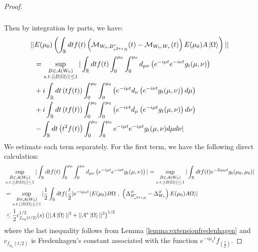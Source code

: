 \documentclass[a4paper,11pt]{article}
\theoremstyle{definition}
\newcommand{\lb}{\left(}
\newcommand{\rb}{\right)}
\begin{document}
\begin{proof}
\begin{align}
\begin{split}
        \end{split}
    \end{align}
    Then by integration by parts, we have:
    \begin{align}
        \begin{split}
            ||&E(\mu_0)\lb\int_\mathbb{R} dt f(t)\lb\mathcal{M}_{W_0,B^r_{e^{2\pi s}R}}(t) - \mathcal{M}_{W_0, W_r}(t)\rb E(\mu_0) A\ket{\Omega}\rb||
            \\&
            = \sup_{\substack{B\in\mathcal{A}(W_0)\\s.t.||B\ket{\Omega}||\leq 1}}|\int_\mathbb{R} dt f(t)\int_0^{\mu_0}\int_0^{\mu_0}d_{\mu\nu}\lb e^{-i\mu t}e^{-i\nu t}g_t(\mu,\nu)\rb 
            \\&
            + i\int_\mathbb{R} dt \lb tf(t)\rb\int_0^{\mu_0}\int_0^{\mu_0}\lb e^{-i\mu t}d_\nu \lb e^{-i\nu t}g_t(\mu,\nu) \rb d\mu\rb
            \\&
            +i\int_\mathbb{R} dt \lb tf(t)\rb\int_0^{\mu_0}\int_0^{\mu_0}\lb e^{-i\nu t} d_\mu\lb e^{-i\mu t} g_t(\mu,\nu)\rb d\nu\rb 
            \\&
            - \int_\mathbb{R} dt \lb t^2f(t) \rb\int_0^{\mu_0}\int_0^{\mu_0} e^{-i\mu t}e^{-i\mu t}g_t(\mu,\nu)d\mu d\nu|
        \end{split}
    \end{align}
    We estimate each term separately. For the first term, we have the following direct calculation:
    \begin{align}
        \begin{split}
            &\sup_{\substack{B\in\mathcal{A}(W_0)\\s.t.||B\ket{\Omega}||\leq 1}}|\int_\mathbb{R} dt f(t)\int_0^{\mu_0}\int_0^{\mu_0} d_{\mu\nu}\lb e^{-i\mu t}e^{-i\nu t}g_t(\mu,\nu) \rb| = \sup_{\substack{B\in\mathcal{A}(W_0)\\s.t.||B\ket{\Omega}||\leq 1}}|\int_\mathbb{R} dt f(t) e^{-2i\mu_0 t}g_t(\mu_0, \mu_0)|
            \\&
            =\sup_{\substack{B\in\mathcal{A}(W_0)\\s.t.||B\ket{\Omega}||\leq 1}}|\frac{1}{2}\int_\mathbb{R} dt f(\frac{t}{2}) e^{-i\mu_0 t}\langle E(\mu_0)B\Omega\text{ , }\lb\Delta_{B^r_{e^{2\pi s}R}}^{it} - \Delta_{W_r}^{it}\rb E(\mu_0)A\Omega\rangle|\\&
            \leq \frac{1}{2}c_{f_{\mu_0}(t/2)}^{1/2}(s)\lb||A\ket{\Omega}||^2 + ||A^*\ket{\Omega}||^2\rb^{1/2}
        \end{split}
    \end{align}
    where the last inequality follows from Lemma \ref{lemma:extensionfredenhagen} and $c_{f_{\mu_0}(t/2)}$ is Fredenhagen's constant associated with the function $e^{-i\mu_0 t}f_(\frac{t}{2})$.


\end{proof}
\end{document}
